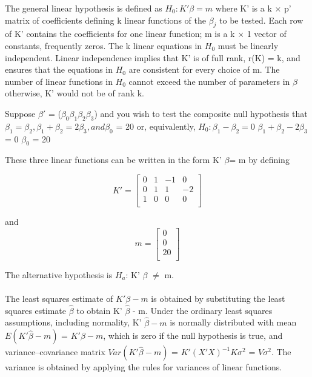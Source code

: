 \documentclass[letterpaper,11pt]{article}
\begin{document}
{The general linear hypothesis is defined as $H_{0}: K' \beta= m$ where K' is a k $\times$ p' matrix of coefficients defining k linear functions of the $\beta_{j}$ to be tested. Each row of K' contains the coefficients for one linear function; m is a k $\times$ 1 vector of constants, frequently zeros. The k linear equations in $H_{0}$ must be linearly independent. Linear independence implies that K' is of full rank, r(K) = k, and ensures that the equations in $H_{0}$ are consistent for every choice of m. The number of linear functions in $H_{0}$ cannot exceed the number of parameters in $\beta$ otherwise, K' would not be of rank k.

Suppose $\beta'$ = ($\beta_{0} \beta_{1} \beta_{2} \beta_{3}$) and you wish to test the composite null hypothesis that 
$\beta_{1} = \beta_{2}, \beta_{1} + \beta_{2} = 2 \beta_{3}, and \beta_{0}$ = 20 or, equivalently,
$H_{0} : \beta_{1} - \beta_{2}= 0$
$\beta_{1} + \beta_{2} − 2 \beta_{3}$ = 0
$\beta_{0}$ = 20

These three linear functions can be written in the form K' $\beta$= m by
defining

\bigskip

\[K'=
\begin{bmatrix}
	 0 & 1 & -1 & 0\\
	 0 & 1 & 1 & -2\\
	 1 & 0 & 0 & 0\\
\end{bmatrix}
\]

\bigskip

and
\[m=
\begin{bmatrix}

	 0 \\
	 0 \\
	 20 \\
	
\end{bmatrix}
\]

The alternative hypothesis is $H_{a}$: K' $\beta$  $\neq$ m.
\\ \\

The least squares estimate of $K' \beta - m$ is obtained by substituting the least squares estimate $\hat{\beta}$ to obtain K' $\hat{\beta}$ - m. Under the ordinary least squares assumptions, including normality, K' $\hat{\beta} - m$ is normally distributed with mean 
$E(K' \hat{\beta} - m)$ = $K' \beta - m$, which is zero if the null hypothesis is true, and variance–covariance matrix $Var(K' \hat{\beta} -m)$ = $K' (X' X)^{-1} K \sigma^{2}$ = $V \sigma^{2}$. The variance is obtained by applying the rules for variances of linear functions.

}
\end{document}
